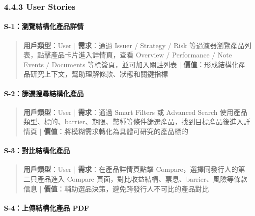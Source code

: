 \subsubsection{4.4.3 User Stories}

\paragraph{S-1：瀏覽結構化產品詳情}

\begin{quote}\small \textbf{用戶類型}：User | \textbf{需求}：通過 Issuer / Strategy / Risk 等過濾器瀏覽產品列表，點擊產品卡片進入詳情頁，查看 Overview / Performance / Note Events / Documents 等標簽頁，並可加入關註列表 | \textbf{價值}：形成結構化產品研究上下文，幫助理解條款、狀態和關鍵指標\end{quote}


\paragraph{S-2：篩選搜尋結構化產品}

\begin{quote}\small \textbf{用戶類型}：User | \textbf{需求}：通過 Smart Filters 或 Advanced Search 使用產品類型、標的、barrier、期限、幣種等條件篩選產品，找到目標產品後進入詳情頁 | \textbf{價值}：將模糊需求轉化為具體可研究的產品標的\end{quote}


\paragraph{S-3：對比結構化產品}

\begin{quote}\small \textbf{用戶類型}：User | \textbf{需求}：在產品詳情頁點擊 Compare，選擇同發行人的第二只產品進入 Compare 頁面，對比收益結構、票息、barrier、風險等條款信息 | \textbf{價值}：輔助選品決策，避免跨發行人不可比的產品對比\end{quote}


\paragraph{S-4：上傳結構化產品 PDF}

